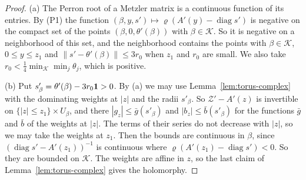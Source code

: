\begin{proof}
(a) The Perron root of a Metzler matrix is a continuous function of its entries. By (P1) the
function $(\beta,y,s')\mapsto\varrho(A'(y)-\operatorname{diag}s')$ is negative on the compact set
of the points $(\beta,0,\theta'(\beta))$ with $\beta\in\mathcal K$. So it is negative on a
neighborhood of this set, and the neighborhood contains the points with $\beta\in\mathcal K$,
$0\le y\le z_1$ and $\lVert s'-\theta'(\beta)\rVert\le3r_0$ when $z_1$ and $r_0$ are small. We also
take $r_0<\frac14\min_{\mathcal K}\min_j\theta_j$, which is positive.

(b) Put $s'_\beta=\theta'(\beta)-3r_0\mathbf{1}>0$. By (a) we may use Lemma~\ref{lem:torus-complex}
with the dominating weights at $|z|$ and the radii $s'_\beta$. So $\mathcal Z'-A'(z)$ is invertible
on $\{|z|\le z_1\}\times U_\beta$, and there $|g_z|\le\bar g(s'_\beta)$ and
$|b_z|\le\bar b(s'_\beta)$ for the functions $\bar g$ and $\bar b$ of the weights at $|z|$. The
terms of their series do not decrease with $|z|$, so we may take the weights at $z_1$. Then the
bounds are continuous in $\beta$, since $(\operatorname{diag}s'-A'(z_1))^{-1}$ is continuous where
$\varrho(A'(z_1)-\operatorname{diag}s')<0$. So they are bounded on $\mathcal K$. The weights are
affine in $z$, so the last claim of Lemma~\ref{lem:torus-complex} gives the holomorphy.


\end{proof}
